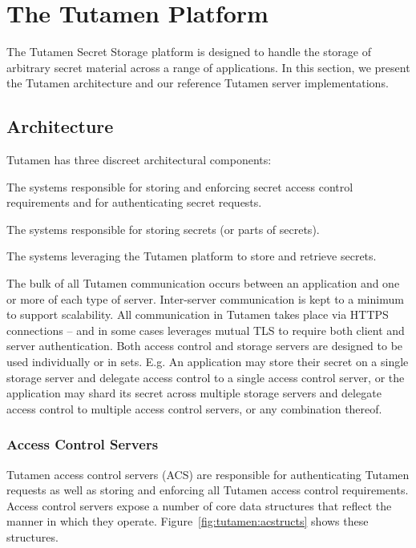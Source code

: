 \section{The Tutamen Platform}
\label{sec:tutamen}

The Tutamen Secret Storage platform is designed to handle the storage
of arbitrary secret material across a range of applications. In this
section, we present the Tutamen architecture and our reference Tutamen
server implementations.

\subsection{Architecture}
\label{sec:tutamen:arch}

Tutamen has three discreet architectural components:

\begin{packed_desc}
\item[Access Control Servers (ACS):] The systems responsible for
  storing and enforcing secret access control requirements and for
  authenticating secret requests.
\item[Storage Servers (SS):] The systems responsible for storing
  secrets (or parts of secrets).
\item[Applications:] The systems leveraging the Tutamen platform to
  store and retrieve secrets.
\end{packed_desc}

The bulk of all Tutamen communication occurs between an application
and one or more of each type of server. Inter-server communication is
kept to a minimum to support scalability. All communication in Tutamen
takes place via HTTPS connections -- and in some cases leverages mutual
TLS to require both client and server authentication. Both access
control and storage servers are designed to be used individually or in
sets. E.g. An application may store their secret on a single storage
server and delegate access control to a single access control server,
or the application may shard its secret across multiple storage
servers and delegate access control to multiple access control
servers, or any combination thereof.

\subsubsection{Access Control Servers}
\label{sec:tutamen:arch:acs}

Tutamen access control servers (ACS) are responsible for
authenticating Tutamen requests as well as storing and enforcing all
Tutamen access control requirements. Access control servers expose a
number of core data structures that reflect the manner in which they
operate. Figure~\ref{fig:tutamen:acstructs} shows these structures.

